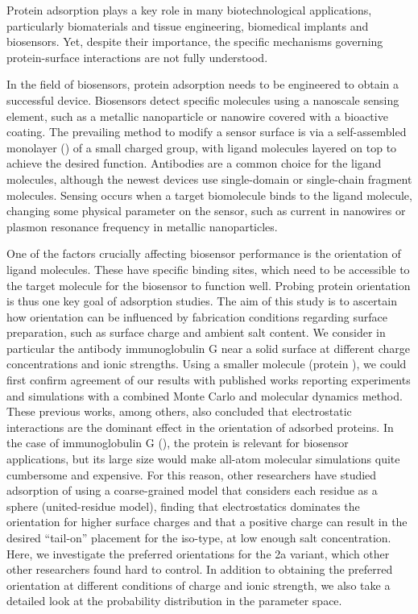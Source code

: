 
Protein adsorption plays a key role in many biotechnological applications, particularly biomaterials and tissue engineering, biomedical implants and biosensors.
Yet, despite their importance, the specific mechanisms governing protein-surface interactions are not fully understood.\cite{Gray2004,RabeVerdesSeegel2011}

In the field of biosensors, protein adsorption needs to be engineered to obtain a successful device. 
Biosensors detect specific molecules using a nanoscale sensing element, such as a metallic nanoparticle or nanowire covered with a bioactive coating. 
The prevailing method to modify a sensor surface is via a self-assembled monolayer (\sam) of a small charged group, with ligand molecules layered on top to achieve the desired function. 
Antibodies are a common choice for the ligand molecules, although the newest devices use single-domain or single-chain fragment molecules.\cite{ByunETal2013,TrillingETal2014} 
Sensing occurs when a target biomolecule binds to the ligand molecule,  changing some physical parameter on the sensor, such as current in nanowires or plasmon resonance frequency in metallic nanoparticles. 

One of the factors crucially affecting biosensor performance is the orientation of ligand molecules.\cite{TajimaTakaiIshihara2011,TrillingBeekwilderZuilhof2013} 
These have specific binding sites, which need to be accessible to the target molecule for the biosensor to function well.
Probing protein orientation is thus one key goal of adsorption studies.
The aim of this study is to ascertain how orientation can be influenced by fabrication conditions regarding surface preparation, such as surface charge and ambient salt content. We consider in particular the antibody immunoglobulin G near a solid surface at different charge concentrations and ionic strengths. Using a smaller molecule (protein \gb), we could first confirm agreement of our results with published works reporting experiments\cite{BaioWeidnerBaughGambleStaytonCastner2012} and   simulations with a combined Monte Carlo and molecular dynamics method.\cite{LiuLiaoZhou2013} These previous works, among others, also concluded that electrostatic interactions are the dominant effect in the orientation of adsorbed proteins. In the case of immunoglobulin G (\ig), the protein is relevant for biosensor applications, but its large size would make all-atom molecular simulations quite cumbersome and expensive. For this reason, other researchers have studied adsorption of \ig using a coarse-grained model that considers each residue as a sphere (united-residue model),\cite{ZhouChenJiang2003} finding that electrostatics dominates the orientation for higher surface charges and that a positive charge can result in the desired ``tail-on'' placement for the  iso-type, at low enough salt concentration. 
Here, we investigate the preferred orientations for the \ig 2a variant, which other other researchers found hard to control.
In addition to obtaining the preferred orientation at different conditions of charge and ionic strength, we also take a detailed look at the probability distribution in the parameter space.

